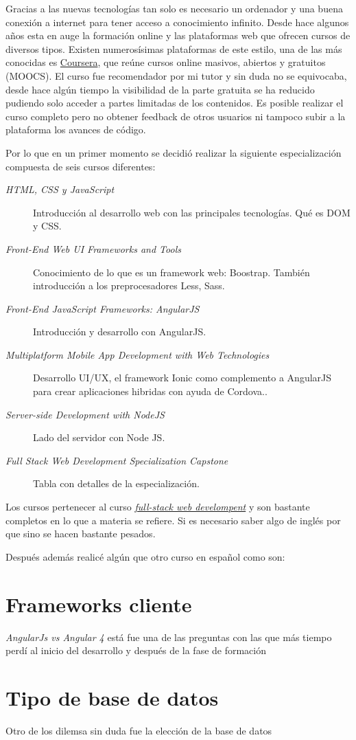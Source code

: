 Gracias a las nuevas tecnologías tan solo es necesario un ordenador y una buena conexión a internet para tener acceso a conocimiento infinito. Desde hace algunos años esta en auge la formación online y las plataformas web que ofrecen cursos de diversos tipos. Existen numerosísimas plataformas de este estilo, una de las más conocidas es  \hyperlink{www.coursera.org}{Coursera}, que reúne cursos online masivos, abiertos y gratuitos (MOOCS). El curso fue recomendador por mi tutor y sin duda no se equivocaba, desde hace algún tiempo la visibilidad de la parte gratuita se ha reducido pudiendo solo acceder a partes limitadas de los contenidos. Es posible realizar el curso completo pero no obtener feedback de otros usuarios ni tampoco subir a la plataforma los avances de código.

Por lo que en un primer momento se decidió realizar la siguiente especialización compuesta de seis cursos diferentes:

\begin{description}
	\item[\emph{HTML, CSS y JavaScript}] Introducción al desarrollo web con las principales tecnologías. Qué es DOM y CSS.
	\item[ \emph{Front-End Web UI Frameworks and Tools}] Conocimiento de lo que es un framework web: Boostrap. También introducción a los preprocesadores Less, Sass.
	\item[\emph{Front-End JavaScript Frameworks: AngularJS} ]  Introducción y desarrollo con AngularJS.
	\item[ \emph{Multiplatform Mobile App Development with Web Technologies}] Desarrollo UI/UX, el framework Ionic como complemento a AngularJS para  crear aplicaciones hibridas con ayuda de Cordova..
	\item[ \emph{Server-side Development with NodeJS} ] Lado del servidor con Node JS.
	\item[ \emph{Full Stack Web Development Specialization Capstone}] Tabla con detalles de la especialización.
\end{description}


Los cursos pertenecer al curso \hyperlink{https://www.coursera.org/specializations/full-stack}{\emph{full-stack web develompent}} y son bastante completos en lo que a materia se refiere. Si es necesario saber algo de inglés por que sino se hacen bastante pesados.

Después además realicé algún que otro curso en español como son: 

 \section{Frameworks cliente}\label{cliente}
 
 \emph{AngularJs vs Angular 4} está fue una de las preguntas con las que más tiempo perdí al inicio del desarrollo y después de la fase de formación
 
  \section{Tipo de base de datos}\label{base de datos}
  
  Otro de los dilemsa sin duda fue la elección de la base de datos
 
 